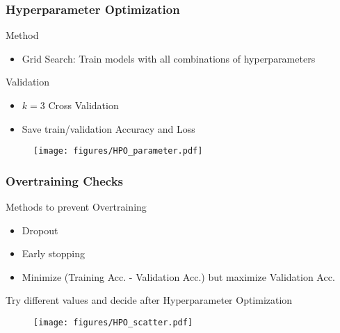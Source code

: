 \documentclass[8pt]{beamer}
\begin{document}
\begin{frame}
\begin{columns}[T]
\begin{column}{0.3\textwidth}
        \end{column}
    \end{columns}

\end{frame}

\begin{frame}
    \frametitle{Hyperparameter Optimization}
    \begin{alertblock}{Method}
        \begin{itemize}
            \item Grid Search: Train models with all combinations of hyperparameters
        \end{itemize}
    \end{alertblock}
    \begin{alertblock}{Validation}
        \begin{itemize}
            \item $k=\num{3}$ Cross Validation
            \item Save train/validation Accuracy and Loss
        \end{itemize}
    \end{alertblock}
    \begin{figure}
        \texttt{[image: figures/HPO\_parameter.pdf]}
    \end{figure}
\end{frame}

\begin{frame}
    \frametitle{Overtraining Checks}
    \begin{alertblock}{Methods to prevent Overtraining}
        \begin{itemize}
            \item Dropout
            \item Early stopping
            \item Minimize (Training Acc. - Validation Acc.)
            \alert{but} maximize Validation Acc.
        \end{itemize}
    Try different values and decide after Hyperparameter Optimization
    \end{alertblock}
    \begin{figure}
        \texttt{[image: figures/HPO\_scatter.pdf]}
    \end{figure}
\end{frame}
\end{document}
